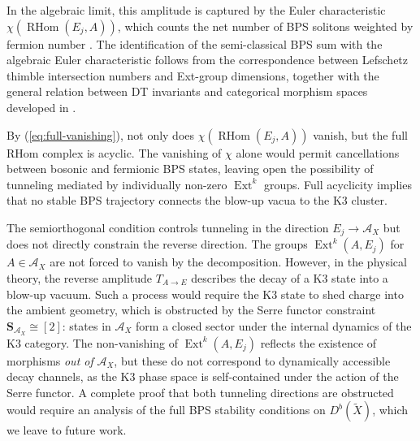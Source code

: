 \documentclass[12pt,reqno]{amsart}
\theoremstyle{remark} \newtheorem{remark}[theorem]{Remark}
\begin{document}
In the
algebraic limit, this amplitude is captured by the Euler
characteristic $\chi(\operatorname{RHom}(E_j, A))$, which counts the
net number of BPS solitons weighted by fermion number \cite{Denef2000,
  GMN2013}. The identification of the semi-classical BPS sum with the
algebraic Euler characteristic follows from the correspondence between
Lefschetz thimble intersection numbers and Ext-group dimensions,
together with the
general relation between DT invariants and categorical morphism spaces
developed in \cite{Bridgeland2007, Bridgeland2017}.

By (\ref{eq:full-vanishing}), not only does
$\chi(\operatorname{RHom}(E_j, A))$ vanish, but the full RHom complex
is acyclic. The vanishing of $\chi$ alone would permit cancellations
between bosonic and fermionic BPS states, leaving open the possibility
of tunneling mediated by individually non-zero $\operatorname{Ext}^k$
groups. Full acyclicity implies that no stable BPS trajectory connects
the blow-up vacua to the K3 cluster.

The semiorthogonal condition controls tunneling in the direction $E_j
\to \mathcal{A}_X$ but does not directly constrain the reverse
direction. The groups $\operatorname{Ext}^k(A, E_j)$ for $A \in
\mathcal{A}_X$ are not forced to vanish by the decomposition. However,
in the physical theory, the reverse amplitude $T_{A \to E}$ describes
the decay of a K3 state into a blow-up vacuum. Such a process would
require the K3 state to shed charge into the ambient geometry, which
is obstructed by the Serre functor constraint $\mathbf{S}_{\mathcal{A}_X} \cong
[2]$: states in $\mathcal{A}_X$ form a closed sector under the
internal dynamics of the K3 category.  The non-vanishing of
$\operatorname{Ext}^k(A, E_j)$ reflects the existence of morphisms
\emph{out of} $\mathcal{A}_X$, but these do not correspond to
dynamically accessible decay channels, as the K3 phase space is
self-contained under the action of the Serre functor. A complete proof
that both tunneling directions are obstructed would require an
analysis of the full BPS stability conditions on $D^b(\widetilde{X})$,
which we leave to future work.
\end{document}

